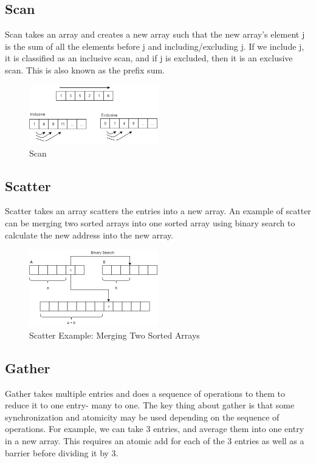 \documentclass[twoside]{article}
\begin{document}
\subsection{Scan}
Scan takes an array and creates a new array such that the new array's element j is the sum of all the elements before j and including/excluding j. If we include j, it is classified as an inclusive scan, and if j is excluded, then it is an exclusive scan. This is also known as the prefix sum.

\begin{figure}[ht]
  \centering
  \includegraphics[width=0.50\textwidth]{./Scanning.png} 
  \caption{Scan}
  \label{fig:scan}
\end{figure}

\subsection{Scatter}
Scatter takes an array scatters the entries into a new array. An example of scatter can be merging two sorted arrays into one sorted array using binary search to calculate the new address into the new array. 

\begin{figure}[ht]
  \centering
  \includegraphics[width=0.50\textwidth]{./Scatter.png} 
  \caption{Scatter Example: Merging Two Sorted Arrays}
  \label{fig:scatter}
\end{figure}

\subsection{Gather}
Gather takes multiple entries and does a sequence of operations to them to reduce it to one entry- many to one. The key thing about gather is that some synchronization and atomicity may be used depending on the sequence of operations. For example, we can take 3 entries, and average them into one entry in a new array. This requires an atomic add for each of the 3 entries as well as a barrier before dividing it by 3.   
\end{document}
